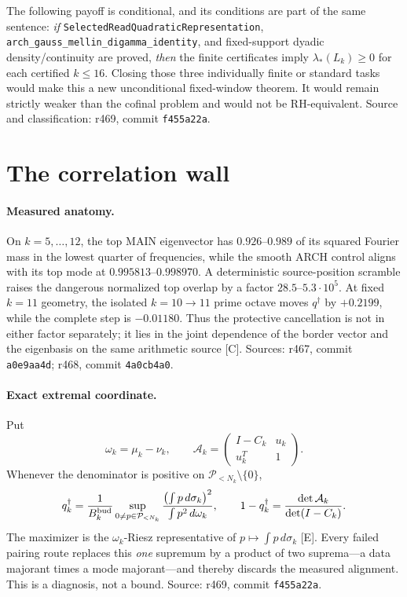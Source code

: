 \documentclass[11pt]{article}
\newcommand{\Egrade}{\textnormal{\small[E]}}
\newcommand{\Cgrade}{\textnormal{\small[C]}}
\newcommand{\code}[1]{\nolinkurl{#1}}
\begin{document}
The following payoff is conditional, and its conditions are part of
the same sentence: \emph{if}
\code{SelectedReadQuadraticRepresentation},
\code{arch_gauss_mellin_digamma_identity}, and fixed-support
dyadic density/continuity are proved, \emph{then} the finite
certificates imply $\lambda_*(L_k)\ge0$ for each certified
$k\le16$.  Closing those three individually finite or standard
tasks would make this a new unconditional fixed-window theorem.
It would remain strictly weaker than the cofinal problem and would
not be RH-equivalent.  Source and classification: r469, commit
\texttt{f455a22a}.

\section{The correlation wall}\label{sec:wall}

\paragraph{Measured anatomy.}
On $k=5,\ldots,12$, the top MAIN eigenvector has
$0.926$--$0.989$ of its squared Fourier mass in the lowest quarter
of frequencies, while the smooth ARCH control aligns with its top
mode at $0.995813$--$0.998970$.  A deterministic source-position
scramble raises the dangerous normalized top overlap by a factor
$28.5$--$5.3\cdot10^5$.  At fixed $k=11$ geometry, the isolated
$k=10\to11$ prime octave moves $q^\dagger$ by $+0.2199$, while the
complete step is $-0.01180$.  Thus the protective cancellation is
not in either factor separately; it lies in the joint dependence of
the border vector and the eigenbasis on the same arithmetic source
\Cgrade.  Sources: r467, commit \texttt{a0e9aa4d}; r468, commit
\texttt{4a0cb4a0}.

\paragraph{Exact extremal coordinate.}
Put
\[
 \omega_k=\mu_k-\nu_k,\qquad
 \mathcal A_k=
 \begin{pmatrix}I-C_k&u_k\\u_k^T&1\end{pmatrix}.
\]
Whenever the denominator is positive on
$\mathcal P_{<N_k}\setminus\{0\}$,
\begin{equation}\label{eq:extremal}
 q_k^\dagger
 =\frac1{B_k^{\rm bud}}
 \sup_{0\ne p\in\mathcal P_{<N_k}}
 \frac{\left(\int p\,d\sigma_k\right)^2}
      {\int p^2\,d\omega_k},
 \qquad
 1-q_k^\dagger=
 \frac{\det\mathcal A_k}{\det(I-C_k)}.
\end{equation}
The maximizer is the $\omega_k$-Riesz representative of
$p\mapsto\int p\,d\sigma_k$ \Egrade.  Every failed pairing route
replaces this \emph{one} supremum by a product of two suprema---a
data majorant times a mode majorant---and thereby discards the
measured alignment.  This is a diagnosis, not a bound.
Source: r469, commit \texttt{f455a22a}.
\end{document}
